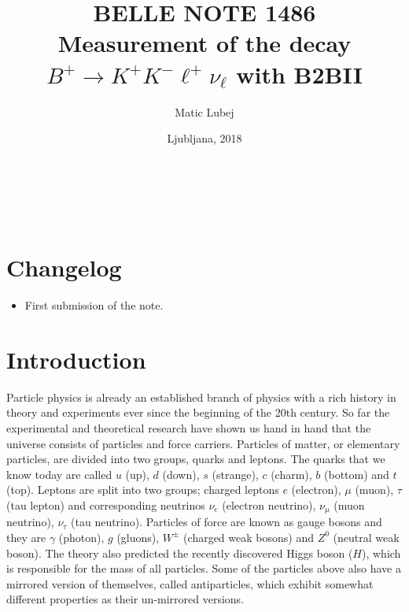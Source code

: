 \documentclass[  headings=standardclasses,
  headings=big,oneside,a4paper,openany,12pt]{scrbook}
\title{{\Large BELLE NOTE 1486}\\\huge {Measurement of the decay $B^+ \to K^+K^-\ell^+\nu_\ell$ with B2BII}}
\author{Matic Lubej}
\date{Ljubljana, 2018}
\begin{document}
\begin{titlingpage} %
\phantom{test}
\vspace{5cm}

\begin{center}
\thetitle
\vspace{0.5 cm} \\
{\Large \theauthor}\\
\vfill
{\Large\thedate}
\end{center}
\end{titlingpage}

\pagestyle{plain}

\chapter*{Changelog}

\begin{itemize}
\item First submission of the note.
\end{itemize}

\tableofcontents
{}


\chapter{Introduction}
Particle physics is already an established branch of physics with a rich history in theory and experiments ever since the beginning of the 20th century. So far the experimental and theoretical research have shown us hand in hand that the universe consists of particles and force carriers. Particles of matter, or elementary particles, are divided into two groups, quarks and leptons. The quarks that we know today are called $u$ (up), $d$ (down), $s$ (strange), $c$ (charm), $b$ (bottom) and $t$ (top). Leptons are split into two groups; charged leptons $e$ (electron), $\mu$ (muon), $\tau$ (tau lepton) and corresponding neutrinos $\nu_e$ (electron neutrino), $\nu_\mu$ (muon neutrino), $\nu_\tau$ (tau neutrino). Particles of force are known as gauge bosons and they are $\gamma$ (photon), $g$ (gluons), $W^\pm$ (charged weak bosons) and $Z^0$ (neutral weak boson). The theory also predicted the recently discovered Higgs boson ($H$), which is responsible for the mass of all particles. Some of the particles above also have a mirrored version of themselves, called antiparticles, which exhibit somewhat different properties as their un-mirrored versions.
\end{document}
